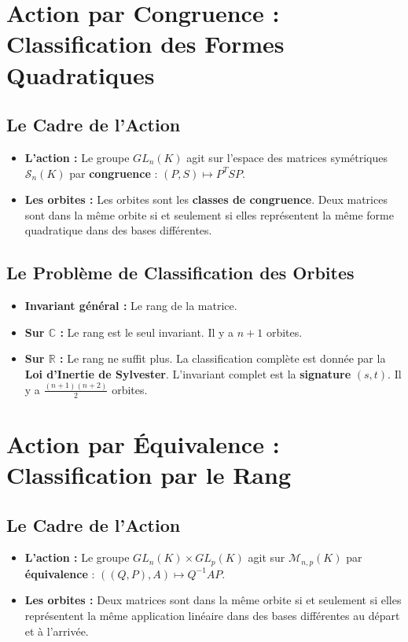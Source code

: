 \documentclass[12pt, a4paper, parskip=full]{report}
\theoremstyle{agregstyle}
\begin{document}
\section{Action par Congruence : Classification des Formes Quadratiques}

\subsection{Le Cadre de l'Action}
\begin{itemize}
    \item \textbf{L'action :} Le groupe $GL_n(K)$ agit sur l'espace des matrices symétriques $\mathcal{S}_n(K)$ par \textbf{congruence} : $(P,S) \mapsto P^T S P$.
    \item \textbf{Les orbites :} Les orbites sont les \textbf{classes de congruence}. Deux matrices sont dans la même orbite si et seulement si elles représentent la même forme quadratique dans des bases différentes.
\end{itemize}

\subsection{Le Problème de Classification des Orbites}
\begin{itemize}
    \item \textbf{Invariant général :} Le rang de la matrice.
    \item \textbf{Sur $\mathbb{C}$ :} Le rang est le seul invariant. Il y a $n+1$ orbites.
    \item \textbf{Sur $\mathbb{R}$ :} Le rang ne suffit plus. La classification complète est donnée par la \textbf{Loi d'Inertie de Sylvester}. L'invariant complet est la \textbf{signature} $(s,t)$. Il y a $\frac{(n+1)(n+2)}{2}$ orbites.
\end{itemize}

\section{Action par Équivalence : Classification par le Rang}

\subsection{Le Cadre de l'Action}
\begin{itemize}
    \item \textbf{L'action :} Le groupe $GL_n(K) \times GL_p(K)$ agit sur $\mathcal{M}_{n,p}(K)$ par \textbf{équivalence} : $((Q,P), A) \mapsto Q^{-1}AP$.
    \item \textbf{Les orbites :} Deux matrices sont dans la même orbite si et seulement si elles représentent la même application linéaire dans des bases différentes au départ et à l'arrivée.
\end{itemize}
\end{document}
